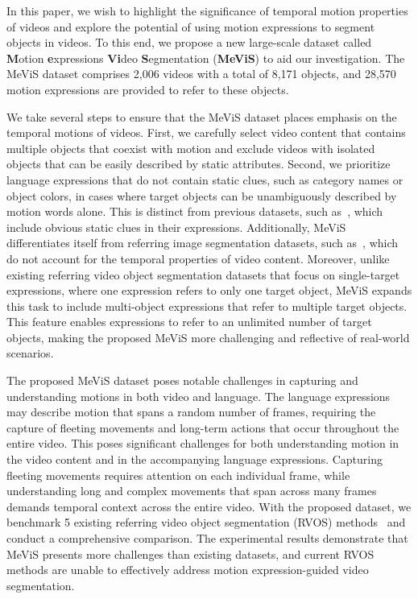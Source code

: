 \documentclass[10pt,twocolumn,letterpaper]{article}
\newcommand{\numvideo}{2,006\xspace}
\newcommand{\numobject}{8,171\xspace}
\newcommand{\numsentence}{28,570\xspace}
\newcommand{\ourdataset}{MeViS\xspace}
\begin{document}
In this paper, we wish to highlight the significance of temporal motion properties of videos and explore the potential of using motion expressions to segment objects in videos. To this end, we propose a new large-scale dataset called \textbf{M}otion \textbf{e}xpressions \textbf{Vi}deo \textbf{S}egmentation (\textbf{\ourdataset}) to aid our investigation. The \ourdataset dataset comprises \numvideo videos with a total of \numobject objects, and \numsentence motion expressions are provided to refer to these objects.

We take several steps to ensure that the \ourdataset dataset places emphasis on the temporal motions of videos. First, we carefully select video content that contains multiple objects that coexist with motion and exclude videos with isolated objects that can be easily described by static attributes. Second, we prioritize language expressions that do not contain static clues, such as category names or object colors, in cases where target objects can be unambiguously described by motion words alone. This is distinct from previous datasets, such as~\cite{gavrilyuk2018actor,khoreva2018video,seo2020urvos}, which include obvious static clues in their expressions. Additionally, \ourdataset differentiates itself from referring image segmentation datasets, such as~\cite{yu2016modeling,mao2016generation,wu2020phrasecut,kazemzadeh-etal-2014-referitgame}, which do not account for the temporal properties of video content. Moreover, unlike existing referring video object segmentation datasets that focus on single-target expressions, where one expression refers to only one target object, \ourdataset expands this task to include multi-object expressions that refer to multiple target objects. This feature enables expressions to refer to an unlimited number of target objects, making the proposed \ourdataset more challenging and reflective of real-world scenarios.


The proposed \ourdataset dataset poses notable challenges in capturing and understanding motions in both video and language. The language expressions may describe motion that spans a random number of frames, requiring the capture of fleeting movements and long-term actions that occur throughout the entire video. This poses significant challenges for both understanding motion in the video content and in the accompanying language expressions. Capturing fleeting movements requires attention on each individual frame, while understanding long and complex movements that span across many frames demands temporal context across the entire video. With the proposed dataset, we benchmark 5 existing referring video object segmentation (RVOS) methods~\cite{vltpami,wu2022referformer,MTTR,Ding_2022_CVPR,seo2020urvos} and conduct a comprehensive comparison. The experimental results demonstrate that \ourdataset presents more challenges than existing datasets, and current RVOS methods are unable to effectively address motion expression-guided video segmentation.
\end{document}
